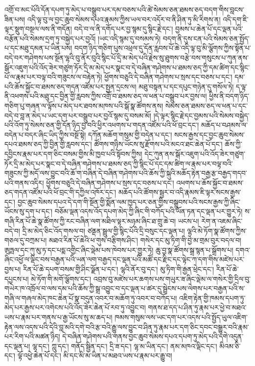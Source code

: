 འགྲོ་བ་མང་པོའི་དོན་དཔག་ཏུ་མེད་པ་བསྒྲུབ་པར་དམ་བཅས་པའི་ཚེ་སེམས་ཅན་ཐམས་ཅད་བདག་གིས་བླངས་ཟིན་པས། འདི་ལྟ་བུ་ལ་བྱང་ཆུབ་སེམས་དཔའ་རྣམས་ཀྱིས་ཡལ་བར་འདོར་བ་ནི་ཤིན་ཏུ་མི་རིགས་ན། འདི་དག་ཇི་ལྟར་སྡུག་བསྔལ་ལས་ནི་གདོན། བདེ་བ་ལ་ནི་དགོད་པར་བྱ་སྙམ་དུ་སྙིང་རྗེ་དང་། བྱམས་པ་ཆེན་པོ་དང་ལྡན་པའི་བརྩོན་པའི་སེམས་དྲག་ཏུ་བསྐྱེད་པར་བྱའོ། །ཡང་འདི་སྙམ་དུ་བསམས་ཏེ། བདག་ནི་དུས་ངན་པའི་སེམས་ཅན་སྤྱོད་པ་དང་མཐུ་དམན་པ་ཡིན་པས། བདག་ཉིད་གཅིག་པུས་འཕྲལ་དུ་དོན་རླབས་པོ་ཆེ་འདི་ལྟ་བུ་མི་ལྕོགས་ཀྱིས་སྟོན་པ་བདེ་བར་གཤེགས་པས་སྔོན་ལྷའི་བུ་ནོར་བུའི་སྙིང་པོ་དྲི་མ་མེད་པའི་རྗེས་སུ་ཐུགས་བརྩེ་བས་གསུངས་པ་ཀུན་ནས་སྒོར་འཇུག་པའི་འོད་ཟེར་གཙུག་ཏོར་དྲི་མ་མེད་པར་སྣང་བ་དེ་བཞིན་གཤེགས་པ་ཐམས་ཅད་ཀྱི་དམ་ཚིག་དང་སྙིང་པོ་ལ་རྣམ་པར་བལྟ་བའི་གཟུངས་ལ་བརྟེན་ཏེ། ཕྱོགས་བཅུའི་དེ་བཞིན་གཤེགས་པ་སྲས་དང་བཅས་པ་དང་། དམ་པའི་ཆོས་སྐྱོང་བ་ཐམས་ཅད་གདན་འཛོམ་པར་སྤྱན་དྲངས་ལ། མཐུ་བསྟན་པ་དང་དཔུང་གཉེན་དུ་གསོལ་ཏེ། ད་ལྟ་ནི་འཕགས་པའི་མཐུ་དང་བྱིན་གྱི་རླབས་ཀྱིས་འགྲོ་བ་ཐམས་ཅད་ལ་ཕན་པ་བསྒྲུབ་པར་བྱས་ལ། ཕྱིས་ནི་བདག་ཉིད་གཅིག་པུ་གཞན་ལ་ལྟོས་པ་མེད་པར་ཐབས་མཁས་པའི་སྒོ་སྣ་ཚོགས་ནས། སེམས་ཅན་ཐམས་ཅད་ལ་ཕན་པ་དང་བདེ་བ་བླ་ན་མེད་པ་ཡང་དག་པར་བསྒྲུབ་པར་བྱའོ་སྙམ་དུ་བསམ་མོ། །དེ་ལྟར་སྙིང་རྗེ་དང་བྱམས་པའི་སེམས་བསྐྱེད་པའི་འོག་ཏུ་སེམས་ཅན་གྱི་དོན་ཉིད་བྱ་བའི་ཕྱིར་འཕགས་པ་གདན་འཛོམ་པའི་ཕོ་བྲང་དང་། མཆོད་པ་བཤམས་ལ་བདེན་པ་བདར་ཞིང་ཡིད་ཀྱིས་བསྔོ་སྟེ། དཀོན་མཆོག་གསུམ་གྱི་བདེན་པ་དང་། སངས་རྒྱས་དང་བྱང་ཆུབ་སེམས་དཔའ་ཐམས་ཅད་ཀྱི་བྱིན་གྱི་རླབས་དང་། ཚོགས་གཉིས་ཡོངས་སུ་རྫོགས་པའི་མངའ་ཐང་ཆེན་པོ་དང་། ཆོས་ཀྱི་དབྱིངས་རྣམ་པར་དག་ཅིང་བསམ་གྱིས་མི་ཁྱབ་པའི་སྟོབས་ཀྱིས། དེང་ཀུན་ནས་སྒོར་འཇུག་པའི་འོད་ཟེར་གཙུག་ཏོར་དྲི་མ་མེད་པར་སྣང་བ་དེ་བཞིན་གཤེགས་པ་ཐམས་ཅད་ཀྱི་སྙིང་པོ་དང་དམ་ཚིག་ལ་རྣམ་པར་བལྟ་བའི་གཟུངས་ཀྱི་མདོ་ལས་བྱུང་བའི་ཆོ་ག་བཞིན་དེ་བཞིན་གཤེགས་པའི་ཆོས་ཀྱི་སྐུའི་མཆོད་རྟེན་བརྒྱ་རྩ་བརྒྱད་གདབ་པའི་གནས་འདིར། ཕྱོགས་བཅུའི་དེ་བཞིན་གཤེགས་པ་སྲས་དང་བཅས་པ་དང་། འཕགས་པ་ཆོས་སྐྱོང་བ་ཐམས་ཅད་གདན་འཛོམ་པའི་ཕོ་བྲང་གི་དཀྱིལ་འཁོར་དང་། མཆོད་པའི་ཚོགས་སྦྱར་བ་འདི་རྣམས་ཇི་ལྟར་སངས་རྒྱས་དང་། བྱང་ཆུབ་སེམས་དཔའ་དེ་དག་གི་སྔོན་གྱི་སྨོན་ལམ་ཁྱད་པར་ཅན་གྱིས་བསྒྲུབས་པའི་སངས་རྒྱས་ཀྱི་ཞིང་ཡོངས་སུ་དག་པ་དང་། བཅོམ་ལྡན་འདས་འོད་དཔག་མེད་ཀྱི་ཞིང་གི་བཀོད་པའི་ཡོན་ཏན་དང་ལྡན་པར་གྱུར་ཏེ། ས་གཞི་རིན་པོ་ཆེ་སྣ་ཚོགས་ཀྱི་རང་བཞིན་ལག་མཐིལ་ལྟར་མཉམ་ཞིང་ཐ་གྲུ་ཆེ་བ། ཡངས་པ། རེག་ན་འཇམ་ཞིང་བདེ་བ། དྲི་མ་མེད་ཅིང་འོད་གསལ་བ། ཙནྡན་སྦྲུལ་གྱི་སྙིང་པོའི་དྲི་བསུང་དང་ལྡན་པ། ལྷའི་མེ་ཏོག་སྣ་ཚོགས་ཀྱིས་གཅལ་དུ་བཀྲམ་པ། མཐའ་རིན་པོ་ཆེའི་ཕ་གུས་བརྩིགས་ཤིང་། གསེར་དང་མུ་ཏིག་གི་བྱེ་མ་གྲམ་བུར་བདལ་བ། ཨུཏྤལ་དང་ཀུ་མུ་ཏ་དང་པདྨ་འགྱིང་ཞིང་ལྡེམ་པས་ཁེབས་པར་གྱུར་ཏེ། ཆུ་བྱ་སྣ་ཚོགས་སྒྲ་སྙན་པ་སྒྲོགས་པ། དགའ་ཞིང་འཕྱོ་ལ་ལྡིང་བས་བརྒྱན་པའི་ཡན་ལག་བརྒྱད་དང་ལྡན་པའི་མཚོ་དང་རྫིང་དང་ལྟེང་ཀ་དག་གིས་མཛེས་པར་བྱས་པ། རིན་པོ་ཆེ་དཔག་བསམ་གྱི་ཤིང་ལྗོན་པ་དང་། ལྷའི་ནོར་བུ་དང་། མུ་ཏིག་གི་རྒྱན་ཕྲེང་དང་། རིན་པོ་ཆེ་དཔྱངས་པ། མེ་ཏོག་གི་མགོ་ལྕོགས་དང་། འབྲས་བུ་མཛེས་པར་ཆགས་པས་གཡུར་ཟ་ཞིང་ལྡེམ་ལ་གསེར་གྱི་དྲིལ་བུ་གཡེར་ཁ་འཁྲོལ་བ་ལས་དམ་པའི་ཆོས་ཀྱི་སྒྲ་འབྱུང་བ་དང་ལྡན་པ་ཚར་དུ་སྦྲེངས་པས་ལེགས་པར་བརྒྱན་པའི་ས་གཞི་ལ་གཞལ་མེད་ཁང་ཆེན་པོ་སྣ་བདུན་འབར་བ་མཆོག་ཏུ་འབར་བ་བཀོད་པ། འཇིག་རྟེན་གྱི་ཁམས་དཔག་ཏུ་མེད་པར་རྒྱས་པར་འགེངས་པའི་འོད་ཟེར་ཆེན་པོ་རབ་ཏུ་འབྱུང་བ། གནས་ཐ་དད་པ་ཤིན་ཏུ་རྣམ་པར་ཕྱེ་བ་མཐའ་ཡས་པ་རྣམ་པར་གནས་པ་རྒྱ་ཡོངས་སུ་མ་ཆད་པ། ཁམས་གསུམ་ལས་ཡང་དག་པར་འདས་པའི་སྤྱོད་ཡུལ་འཇིག་རྟེན་ལས་འདས་པའི་དེའི་བླ་མའི་དགེ་བའི་རྩ་བའི་རྒྱུ་ལས་བྱུང་བ་ཤིན་ཏུ་རྣམ་པར་དག་ཅིང་དབང་བསྒྱུར་བའི་རྣམ་པར་རིག་པའི་མཚན་ཉིད། དེ་བཞིན་གཤེགས་པའི་གནས་བྱང་ཆུབ་སེམས་དཔའ་དཔག་ཏུ་མེད་པའི་དགེ་འདུན་དང་ལྡན་པ། ལྷ་དང་། ཀླུ་དང་། གནོད་སྦྱིན་དང་། དྲི་ཟ་དང་། ལྷ་མ་ཡིན་དང་། ནམ་མཁའ་ལྡིང་དང་། མིའམ་ཅི་དང་། ལྟོ་འཕྱེ་ཆེན་པོ་དང་། མི་དང་མི་མ་ཡིན་པ་མཐའ་ཡས་པ་རྣམ་པར་རྒྱུ་བ། 